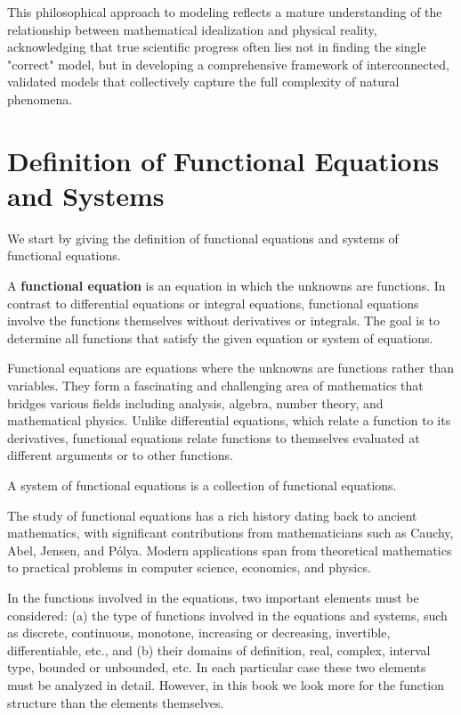 This philosophical approach to modeling reflects a mature understanding of the relationship between mathematical idealization and physical reality, acknowledging that true scientific progress often lies not in finding the single "correct" model, but in developing a comprehensive framework of interconnected, validated models that collectively capture the full complexity of natural phenomena.

\section{Definition of Functional Equations and Systems}
We start by giving the definition of functional equations and systems of functional equations.
\begin{definition}
A \textbf{functional equation} is an equation in which the unknowns are functions. In contrast to differential equations or integral equations, functional equations involve the functions themselves without derivatives or integrals. The goal is to determine all functions that satisfy the given equation or system of equations.
\end{definition}




Functional equations are equations where the unknowns are functions rather than variables. They form a fascinating and challenging area of mathematics that bridges various fields including analysis, algebra, number theory, and mathematical physics. Unlike differential equations, which relate a function to its derivatives, functional equations relate functions to themselves evaluated at different arguments or to other functions.

A system of functional equations is a collection of functional equations.

The study of functional equations has a rich history dating back to ancient mathematics, with significant contributions from mathematicians such as Cauchy, Abel, Jensen, and Pólya. Modern applications span from theoretical mathematics to practical problems in computer science, economics, and physics.

In the functions involved in the equations, two important elements must be considered: (a) the type of functions involved in the equations and systems, such as discrete, continuous, monotone, increasing or decreasing, invertible, differentiable, etc., and (b) their domains of definition, real, complex, interval type, bounded or unbounded, etc. In each particular case these two elements must be analyzed in detail. However, in this book we look more for the function structure than the elements themselves.

